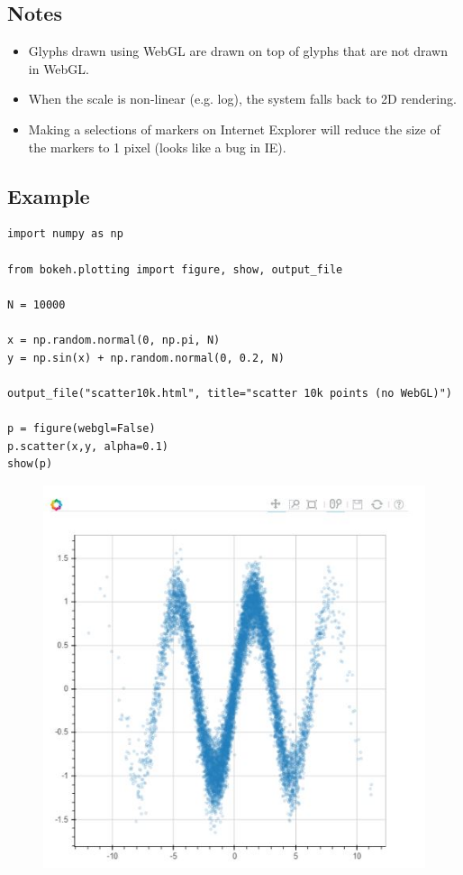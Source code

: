 \documentclass[a4paper,12pt]{article}
\begin{document}
\subsection{Notes}
\begin{itemize}
\item Glyphs drawn using WebGL are drawn on top of glyphs that are not drawn in WebGL.
\item When the scale is non-linear (e.g. log), the system falls back to 2D rendering.
\item Making a selections of markers on Internet Explorer will reduce the size of the markers to 1 pixel (looks like a bug in IE).
\end{itemize}

\subsection{Example}
\begin{framed}
\begin{verbatim}
import numpy as np

from bokeh.plotting import figure, show, output_file

N = 10000

x = np.random.normal(0, np.pi, N)
y = np.sin(x) + np.random.normal(0, 0.2, N)

output_file("scatter10k.html", title="scatter 10k points (no WebGL)")

p = figure(webgl=False)
p.scatter(x,y, alpha=0.1)
show(p)
\end{verbatim}
\end{framed}
\begin{figure}
\centering
\includegraphics[width=0.7\linewidth]{images/06-WebGL-01}

\end{figure}
\end{document}
